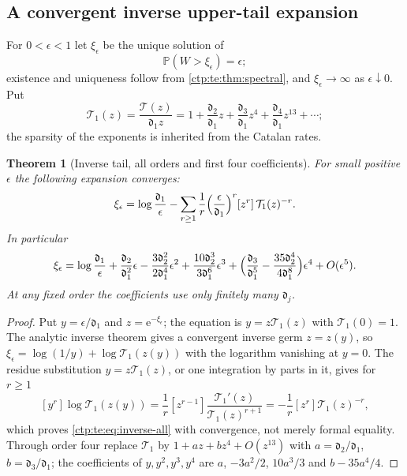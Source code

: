 \documentclass[11pt,a4paper]{article}
\numberwithin{equation}{section}
\newtheorem{theorem}{Theorem}[section]
\theoremstyle{definition}
\theoremstyle{remark}
\newcommand{\e}{\mathrm e}
\newcommand{\PP}{\mathbb P}
\newcommand{\sd}{\mathfrak d}
\begin{document}
\subsection{A convergent inverse upper-tail expansion}
For $0<\epsilon<1$ let $\xi_\epsilon$ be the unique solution of
\begin{equation}\label{ctp:te:eq:quantile}
 \PP(W>\xi_\epsilon)=\epsilon;
\end{equation}
existence and uniqueness follow from \cref{ctp:te:thm:spectral}, and
$\xi_\epsilon\to\infty$ as $\epsilon\downarrow0$. Put
\begin{equation}\label{ctp:te:eq:V}
 \mathcal T_1(z)=\frac{\mathcal T(z)}{\sd_1z}=1+\frac{\sd_2}{\sd_1}z
 +\frac{\sd_3}{\sd_1}z^4+\frac{\sd_4}{\sd_1}z^{13}+\cdots;
\end{equation}
the sparsity of the exponents is inherited from the Catalan rates.

\begin{theorem}[Inverse tail, all orders and first four coefficients]\label{ctp:te:thm:inverse}
For small positive $\epsilon$ the following expansion converges:
\begin{equation}\label{ctp:te:eq:inverse-all}
 \xi_\epsilon=\log\frac{\sd_1}\epsilon-\sum_{r\ge1}\frac1r\Bigl(\frac\epsilon{\sd_1}\Bigr)^r
 [z^r]\,\mathcal T_1(z)^{-r}.
\end{equation}
In particular
\begin{equation}\label{ctp:te:eq:inverse-four}
 \xi_\epsilon=\log\frac{\sd_1}\epsilon+\frac{\sd_2}{\sd_1^2}\epsilon
 -\frac{3\sd_2^2}{2\sd_1^4}\epsilon^2+\frac{10\sd_2^3}{3\sd_1^6}\epsilon^3
 +\Bigl(\frac{\sd_3}{\sd_1^5}-\frac{35\sd_2^4}{4\sd_1^8}\Bigr)\epsilon^4+O(\epsilon^5).
\end{equation}
At any fixed order the coefficients use only finitely many $\sd_j$.
\end{theorem}
\begin{proof}
Put $y=\epsilon/\sd_1$ and $z=\e^{-\xi_\epsilon}$; the equation is
$y=z\mathcal T_1(z)$ with $\mathcal T_1(0)=1$. The analytic inverse theorem
gives a convergent inverse germ $z=z(y)$, so
$\xi_\epsilon=\log(1/y)+\log\mathcal T_1(z(y))$ with the logarithm vanishing at
$y=0$. The residue substitution $y=z\mathcal T_1(z)$, or one integration by
parts in it, gives for $r\ge1$
\[
 [y^r]\log\mathcal T_1(z(y))=\frac1r[z^{r-1}]\frac{\mathcal T_1'(z)}{\mathcal T_1(z)^{r+1}}
 =-\frac1r[z^r]\mathcal T_1(z)^{-r},
\]
which proves \eqref{ctp:te:eq:inverse-all} with convergence, not merely
formal equality. Through order four replace $\mathcal T_1$ by
$1+az+bz^4+O(z^{13})$ with $a=\sd_2/\sd_1$, $b=\sd_3/\sd_1$; the
coefficients of $y,y^2,y^3,y^4$ are $a$, $-3a^2/2$, $10a^3/3$ and $b-35a^4/4$.
\end{proof}
\end{document}
